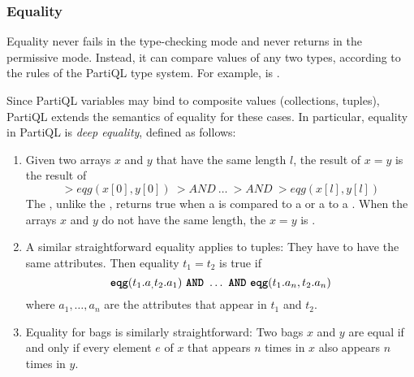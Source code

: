 \subsubsection{Equality}
\label{sec:equality}
Equality never fails in the type-checking mode and never returns \MISSING in
the permissive mode. Instead, it can compare values of any two types, according
to the rules of the PartiQL type system. For example,  is
.

Since PartiQL variables may bind to composite values (collections, tuples),
PartiQL extends the semantics of equality for these cases. In particular,
equality in PartiQL is {\em deep equality}, defined as follows: 

\begin{enumerate}
\item Given two arrays $x$ and $y$ that have the same length $l$, the result of
$x=y$ is the result of 
\[\gt{eqg}(x[0], y[0])\ \gt{AND}\ \ldots\ \gt{AND}\ \gt{eqg}(x[l], y[l])\]
The , unlike the \gt{=}, returns true when a \NULL is compared to a \NULL 
or a \MISSING to a \MISSING. When the arrays $x$ and
$y$ do not have the same length, the $x=y$ is .


\item A similar straightforward equality applies to tuples: 
They have to have the same attributes. Then equality $t_1 =
t_2$ is true if 
\[\gt{eqg}(t_1.a_, t_2.a_1)\ \gl{AND}\ \ldots\ \gl{AND}\ \gt{eqg}(t_1.a_n, t_2.a_n)\]
where $a_1, \ldots, a_n$ are the attributes that appear in $t_1$ and
$t_2$.%

 
\item Equality for bags is similarly straightforward: Two bags $x$ and $y$ are
equal if and only if every element $e$ of $x$ that appears $n$ times in $x$ also
appears $n$ times in $y$.
\end{enumerate}

